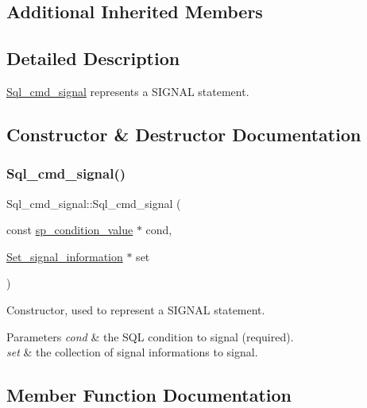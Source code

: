 \subsection*{Additional Inherited Members}


\subsection{Detailed Description}
\mbox{\hyperlink{classSql__cmd__signal}{Sql\+\_\+cmd\+\_\+signal}} represents a S\+I\+G\+N\+AL statement. 

\subsection{Constructor \& Destructor Documentation}
\mbox{\label{classSql__cmd__signal_a89af0cc810f33f7203960346cc3a32d6}} 
\subsubsection{\texorpdfstring{Sql\+\_\+cmd\+\_\+signal()}{Sql\_cmd\_signal()}}
{\footnotesize\ttfamily Sql\+\_\+cmd\+\_\+signal\+::\+Sql\+\_\+cmd\+\_\+signal (\begin{DoxyParamCaption}\item[{const \mbox{\hyperlink{classsp__condition__value}{sp\+\_\+condition\+\_\+value}} $\ast$}]{cond,  }\item[{\mbox{\hyperlink{classSet__signal__information}{Set\+\_\+signal\+\_\+information}} $\ast$}]{set }\end{DoxyParamCaption})\hspace{0.3cm}{\ttfamily [inline]}}

Constructor, used to represent a S\+I\+G\+N\+AL statement. 
\begin{DoxyParams}{Parameters}
{\em cond} & the S\+QL condition to signal (required). \\
\hline
{\em set} & the collection of signal informations to signal. \\
\hline
\end{DoxyParams}


\subsection{Member Function Documentation}
\mbox{\label{classSql__cmd__signal_a302864ac4023450ad3171525426eb1dc}} 
